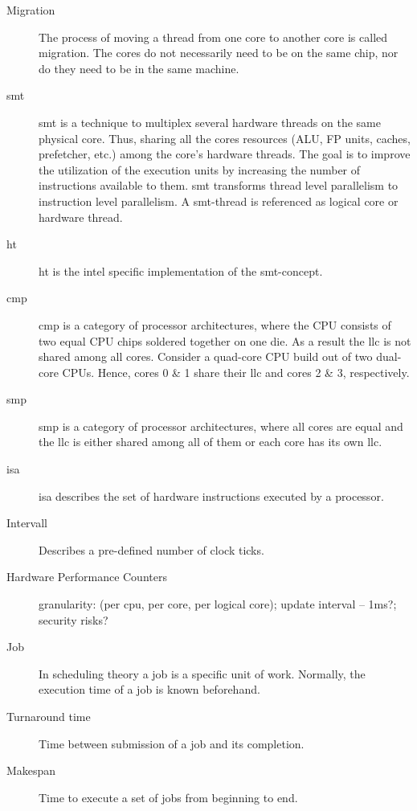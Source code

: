 \begin{description}
  \item[Migration] The process of moving a thread from one core to another core
    is called migration.
    The cores do not necessarily need to be on the same chip, nor do they need
    to be in the same machine.

  \item[\Gls{smt}] \gls{smt} is a technique to multiplex several hardware
    threads on the same physical core.
    Thus, sharing all the cores resources (ALU, FP units, caches, prefetcher,
    etc.) among the core's hardware threads.
    The goal is to improve the utilization of the execution units by increasing
    the number of instructions available to them.
    \gls{smt} transforms thread level parallelism to instruction level
    parallelism.
    A \gls{smt}-thread is referenced as logical core or hardware thread.

  \item[\Gls{ht}] \gls{ht} is the \gls{intel} specific implementation of the
    \gls{smt}-concept.

  \item[\Gls{cmp}] \gls{cmp} is a category of processor architectures, where
    the CPU consists of two equal CPU chips soldered together on one die.
    As a result the \gls{llc} is not shared among all cores.
    Consider a quad-core CPU build out of two dual-core CPUs.
    Hence, cores 0 \& 1 share their \gls{llc} and cores 2 \& 3, respectively.

  \item[\Gls{smp}] \gls{smp} is a category of processor architectures, where
    all cores are equal and the \gls{llc} is either shared among all of them or
    each core has its own \gls{llc}.

  \item[\Gls{isa}]\gls{isa} describes the set of hardware instructions executed
    by a processor.

  \item[Intervall] Describes a pre-defined number of clock ticks.

  \item[Hardware Performance Counters]  granularity: (per
    cpu, per core, per logical core);
    update interval -- 1ms?;
    security risks?

  \item[Job] In scheduling theory a job is a specific unit of work. Normally,
    the execution time of a job is known beforehand.

  \item[Turnaround time] Time between submission of a job and its completion.

  \item[Makespan] Time to execute a set of jobs from beginning to end.




\end{description}
